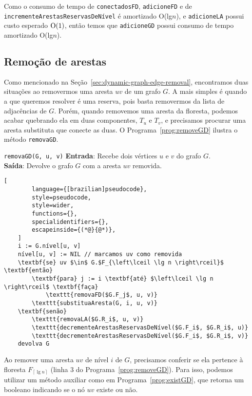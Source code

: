 Como o consumo de tempo de \texttt{conectadosFD}, \texttt{adicioneFD} e de \texttt{incrementeArestasReservasDeNível} é amortizado O(lg$n$), e \texttt{adicioneLA} possui custo esperado $\mathrm{O}(1)$, então temos que \texttt{adicioneGD} possui consumo de tempo amortizado O(lg$n$).

\subsection{Remoção de arestas}
\label{sec:code-edge-removal}

Como mencionado na Seção~\ref{sec:dynamic-graph-edge-removal}, encontramos duas situações ao removermos uma aresta $uv$ de um grafo $G$. A mais simples é quando a que queremos resolver é uma reserva, pois basta removermos da lista de adjacências de $G$. Porém, quando removemos uma aresta da floresta, podemos acabar quebrando ela em duas componentes, $T_u$ e $T_v$, e precisamos procurar uma aresta substituta que conecte as duas. O Programa~\ref{prog:removeGD} ilustra o método \texttt{removaGD}.

\begin{programruledcaption}{\texttt{removaGD(G, u, v)} \label{prog:removeGD}}
    \noindent\textbf{Entrada}: Recebe dois vértices $u$ e $v$ do grafo $G$. \\
    \textbf{Saída}: Devolve o grafo $G$ com a aresta $uv$ removida.
    \vspace{-0.5\baselineskip}
    \begin{lstlisting}[
        language={[brazilian]pseudocode},
        style=pseudocode,
        style=wider,
        functions={},
        specialidentifiers={},
        escapeinside={(*@}{@*)},
    ]
    i := G.nível[u, v]
    nível[u, v] := NIL // marcamos uv como removida
    \textbf{se} uv $\in$ G.$F_{\left\lceil \lg n \right\rceil}$ \textbf{então}
        \textbf{para} j := i \textbf{até} $\left\lceil \lg n \right\rceil$ \textbf{faça}
            \texttt{removaFD($G.F_j$, u, v)}
        \texttt{substituaAresta(G, i, u, v)}
    \textbf{senão}
        \texttt{removaLA($G.R_i$, u, v)}
        \texttt{decrementeArestasReservasDeNível($G.F_i$, $G.R_i$, u)}
        \texttt{decrementeArestasReservasDeNível($G.F_i$, $G.R_i$, v)}
    devolva G
    \end{lstlisting}
    \vspace{-0.5\baselineskip}
\end{programruledcaption}

Ao remover uma aresta $uv$ de nível $i$ de $G$, precisamos conferir se ela pertence à floresta $F_{\left\lceil \lg n \right\rceil}$ (linha $3$ do Programa~\ref{prog:removeGD}). Para isso, podemos utilizar um método auxiliar como em Programa~\ref{prog:existGD}, que retorna um booleano indicando se o nó $uv$ existe ou não.

